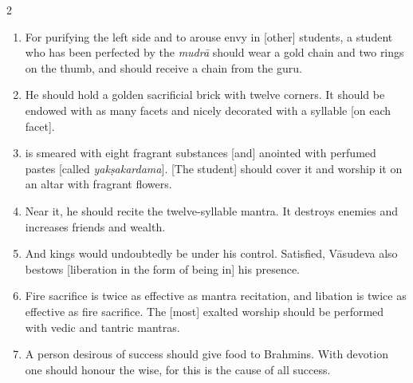 \begin{nohyp}
\begin{multicols}{2}
\begin{eng}
\begin{enumerate}[nosep]
\item[17.] For purifying the left side and to arouse envy in [other] students, a student who has been perfected by the \textit{mudrā} should wear a gold chain and two rings on the thumb, and should receive a chain from the guru.
\item[18.] He should hold a golden sacrificial brick with twelve corners. It should be endowed with as many facets and nicely decorated with a syllable [on each facet].
\item[19.] [The brick] is smeared with eight fragrant substances [and] anointed with perfumed pastes [called \textit{yakṣakardama}]. [The student] should cover it and worship it on an altar with fragrant flowers. 
\item[20.] Near it, he should recite the twelve-syllable mantra. It destroys enemies and increases friends and wealth.
\item[21.] And kings would undoubtedly be under his control. Satisfied, Vāsudeva also bestows [liberation in the form of being in] his presence. 
\item[22.] Fire sacrifice is twice as effective as mantra recitation, and libation is twice as effective as fire sacrifice. The [most] exalted worship should be performed with vedic and tantric mantras.
\item[23.] A person desirous of success should give food to Brahmins. With devotion one should honour the wise, for this is the cause of all success.
\end{enumerate}
\vskip 7pt

\Section*[Conclusion]{[Conclusion]}


\end{eng}
\end{multicols}
\end{nohyp}
